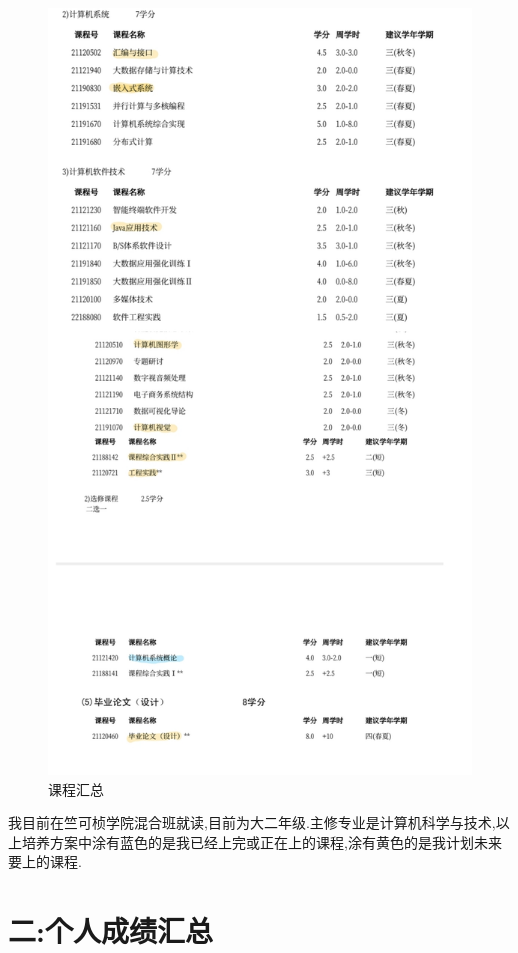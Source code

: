 \documentclass{article}
\begin{document}
    \begin{figure}[H]
    \centering
    \includegraphics[width=1\textwidth]{3.jpg}
    \caption{\label{总结}课程汇总}
    \end{figure}

我目前在竺可桢学院混合班就读,目前为大二年级.主修专业是计算机科学与技术,以上培养方案中涂有蓝色的是我已经上完或正在上的课程,涂有黄色的是我计划未来要上的课程.

\section*{二:个人成绩汇总}
\end{document}
